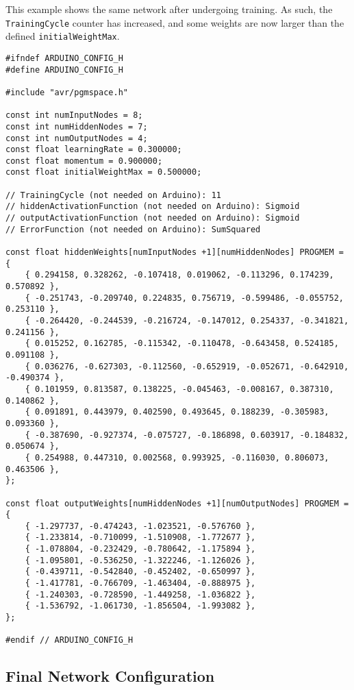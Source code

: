 \documentclass[a4paper]{article}
\begin{document}
This example shows the same network after undergoing training. As such, the \lstinline{TrainingCycle} counter has increased, and some weights are now larger than the defined \lstinline{initialWeightMax}.

\begin{lstlisting}
#ifndef ARDUINO_CONFIG_H
#define ARDUINO_CONFIG_H

#include "avr/pgmspace.h"

const int numInputNodes = 8;
const int numHiddenNodes = 7;
const int numOutputNodes = 4;
const float learningRate = 0.300000;
const float momentum = 0.900000;
const float initialWeightMax = 0.500000;

// TrainingCycle (not needed on Arduino): 11
// hiddenActivationFunction (not needed on Arduino): Sigmoid
// outputActivationFunction (not needed on Arduino): Sigmoid
// ErrorFunction (not needed on Arduino): SumSquared

const float hiddenWeights[numInputNodes +1][numHiddenNodes] PROGMEM = {
    { 0.294158, 0.328262, -0.107418, 0.019062, -0.113296, 0.174239, 0.570892 }, 
    { -0.251743, -0.209740, 0.224835, 0.756719, -0.599486, -0.055752, 0.253110 }, 
    { -0.264420, -0.244539, -0.216724, -0.147012, 0.254337, -0.341821, 0.241156 }, 
    { 0.015252, 0.162785, -0.115342, -0.110478, -0.643458, 0.524185, 0.091108 }, 
    { 0.036276, -0.627303, -0.112560, -0.652919, -0.052671, -0.642910, -0.490374 }, 
    { 0.101959, 0.813587, 0.138225, -0.045463, -0.008167, 0.387310, 0.140862 }, 
    { 0.091891, 0.443979, 0.402590, 0.493645, 0.188239, -0.305983, 0.093360 }, 
    { -0.387690, -0.927374, -0.075727, -0.186898, 0.603917, -0.184832, 0.050674 }, 
    { 0.254988, 0.447310, 0.002568, 0.993925, -0.116030, 0.806073, 0.463506 }, 
};

const float outputWeights[numHiddenNodes +1][numOutputNodes] PROGMEM = {
    { -1.297737, -0.474243, -1.023521, -0.576760 }, 
    { -1.233814, -0.710099, -1.510908, -1.772677 }, 
    { -1.078804, -0.232429, -0.780642, -1.175894 }, 
    { -1.095801, -0.536250, -1.322246, -1.126026 }, 
    { -0.439711, -0.542840, -0.452402, -0.650997 }, 
    { -1.417781, -0.766709, -1.463404, -0.888975 }, 
    { -1.240303, -0.728590, -1.449258, -1.036822 }, 
    { -1.536792, -1.061730, -1.856504, -1.993082 }, 
};

#endif // ARDUINO_CONFIG_H
\end{lstlisting}

\newpage
\subsection{Final Network Configuration}%
\label{subsec:a2_finalconfig}
\end{document}
